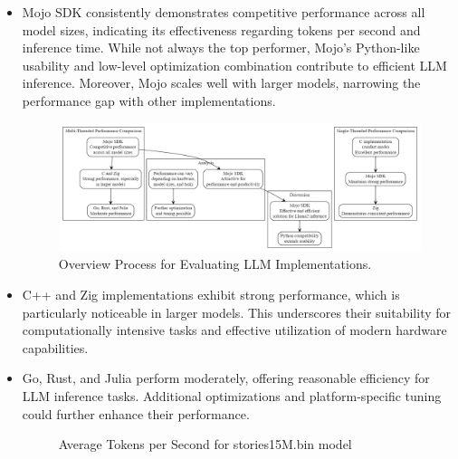 \documentclass[conference]{IEEEtran}
\begin{document}
\begin{itemize}
    \item Mojo SDK consistently demonstrates competitive performance across all model sizes, indicating its effectiveness regarding tokens per second and inference time. While not always the top performer, Mojo's Python-like usability and low-level optimization combination contribute to efficient LLM inference. Moreover, Mojo scales well with larger models, narrowing the performance gap with other implementations.
    \begin{figure}[h]
        \centerline{\includegraphics[width=\linewidth]{fig3.png}}
        \caption{Overview Process for Evaluating LLM Implementations.}
        \label{fig2}
    \end{figure}
    \item C++ and Zig implementations exhibit strong performance, which is particularly noticeable in larger models. This underscores their suitability for computationally intensive tasks and effective utilization of modern hardware capabilities.
    \item Go, Rust, and Julia perform moderately, offering reasonable efficiency for LLM inference tasks. Additional optimizations and platform-specific tuning could further enhance their performance.

    \begin{figure}[H]
        \centering
        \caption{Average Tokens per Second for stories15M.bin model}
      \end{figure}
      

\end{itemize}
\end{document}
